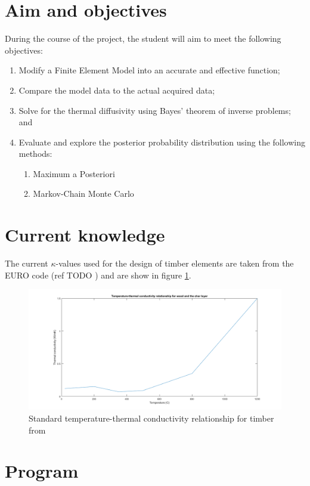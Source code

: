 \section{Aim and objectives}
During the course of the project, the student will aim to meet the following objectives:
\begin{enumerate}
 \item Modify a Finite Element Model into an accurate and effective function;
 \item Compare the model data to the actual acquired data;
 \item Solve for the thermal diffusivity using Bayes' theorem of inverse problems; and
 \item Evaluate and explore the posterior probability distribution using the following methods:
 	\begin{enumerate}
 		\item Maximum a Posteriori
 		\item Markov-Chain Monte Carlo 	
 	\end{enumerate}
\end{enumerate}

\section{Current knowledge}
	
	
	The current $\kappa$-values used for the design of timber elements are taken from the EURO code (ref TODO \citep{Euro:2004}) and are show in figure \ref{kvalue_fig}.  
	\begin{figure}[H]
	\label{kvalue_fig}
	\centering
	\includegraphics[width = \linewidth]{figures/kvalues_euro.png}
	\caption{Standard temperature-thermal conductivity relationship for timber from \citep{Euro:2004}}
	\end{figure}
	

	
\section{Program}